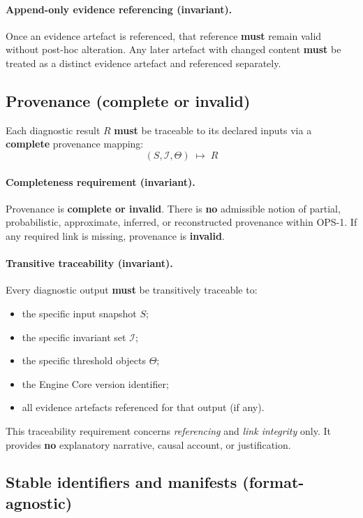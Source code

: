 \paragraph{Append-only evidence referencing (invariant).}
Once an evidence artefact is referenced,
that reference \textbf{must} remain valid
without post-hoc alteration.
Any later artefact with changed content
\textbf{must} be treated as a distinct
evidence artefact and referenced separately.

\subsection{Provenance (complete or invalid)}

Each diagnostic result $R$ \textbf{must} be traceable
to its declared inputs via a
\textbf{complete} provenance mapping:
\[
(S,\mathcal{I},\Theta) \;\mapsto\; R
\]

\paragraph{Completeness requirement (invariant).}
Provenance is \textbf{complete or invalid}.
There is \textbf{no} admissible notion of partial,
probabilistic, approximate, inferred,
or reconstructed provenance within OPS-1.
If any required link is missing,
provenance is \textbf{invalid}.

\paragraph{Transitive traceability (invariant).}
Every diagnostic output \textbf{must} be transitively
traceable to:
\begin{itemize}
  \item the specific input snapshot $S$;
  \item the specific invariant set $\mathcal{I}$;
  \item the specific threshold objects $\Theta$;
  \item the Engine Core version identifier;
  \item all evidence artefacts referenced for that output (if any).
\end{itemize}

This traceability requirement concerns
\emph{referencing} and \emph{link integrity} only.
It provides \textbf{no} explanatory narrative,
causal account, or justification.

\subsection{Stable identifiers and manifests (format-agnostic)}

